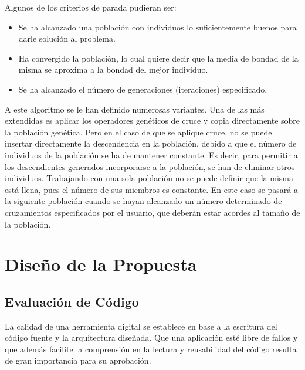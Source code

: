 \documentclass[a4paper,openright,11pt,oneside]{book}
\begin{document}
		Algunos de los criterios de parada pudieran ser:
		
		\begin{itemize}
			\item Se ha alcanzado una población con individuos lo suficientemente buenos para darle solución al problema.
			\item Ha convergido la población, lo cual quiere decir que la  media  de  bondad  de  la  misma  se aproxima a la bondad del mejor individuo.
			\item Se ha alcanzado el número de generaciones (iteraciones) especificado.
		\end{itemize}
	
		A este algoritmo se le han definido numerosas variantes. Una de las más extendidas es aplicar los operadores genéticos de cruce y copia directamente sobre la población genética. Pero en el caso de que se aplique cruce, no se puede insertar directamente la descendencia en la población, debido a que el número de individuos de la población se ha de mantener constante. Es decir, para permitir a los descendientes generados incorporarse a la población, se  han  de  eliminar  otros individuos. Trabajando con una sola población no se puede definir que la misma está llena, pues el número de sus miembros es constante. En este caso se pasará a la siguiente población cuando se hayan alcanzado un número determinado de cruzamientos especificados por el usuario, que deberán estar acordes al tamaño de la población.
		
		
\chapter{Diseño de la Propuesta}
		
\section{Evaluación de Código}

	La calidad de una herramienta digital se establece en base a la escritura del código fuente y la arquitectura diseñada. Que una aplicación esté libre de fallos y que además facilite la comprensión en la lectura y reusabilidad del código resulta de gran importancia para su aprobación.
\end{document}
